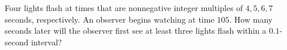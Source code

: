 Four lights flash at times that are nonnegative integer multiples of $4,5,6,7$ seconds, respectively. An observer begins watching at time $105$. How many seconds later will the observer first see at least three lights flash within a $0.1$-second interval?
